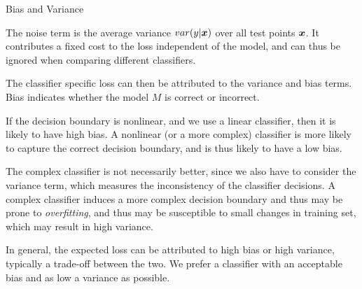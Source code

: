 \begin{frame}{Bias and Variance}
\small

The noise term is the average variance
$var(y|{\boldsymbol x})$ over all test points ${\boldsymbol x}$. It contributes a f\/{i}xed
cost to the loss independent of the model, and can thus be ignored
when comparing different classif\/{i}ers. 

\medskip
The classif\/{i}er specif\/{i}c loss
can then be attributed to the variance and bias terms. 
Bias indicates whether the model $M$ is correct or incorrect. 

\medskip
If the decision boundary is
nonlinear, and we use a linear classif\/{i}er, then it is likely to
have high bias. A nonlinear (or a
more complex) classif\/{i}er is more likely to capture the correct
decision boundary, and is thus likely to have a low bias.

\medskip
The complex
classif\/{i}er is not necessarily better, since we also have to consider
the variance term, which measures the inconsistency of the
classif\/{i}er decisions. A complex classif\/{i}er induces a more complex
decision boundary and thus may be prone to {\em overf\/{i}tting},
and thus may be
susceptible to small changes in training set, which may result in
high variance.

\medskip
In general, the expected loss can be attributed to high bias or
high variance, typically a trade-off between the two.
We prefer a classif\/{i}er with an acceptable bias
and as low a variance as possible.

\end{frame}



